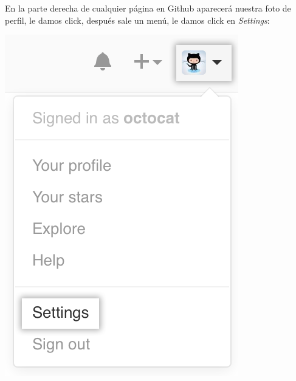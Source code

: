 \documentclass{article}
\begin{document}
\begin{itemize}
\begin{enumerate}
      En la parte derecha de cualquier página en Github aparecerá nuestra foto de perfil, le damos click, después sale un menú, le damos click en \textit{Settings}:
      \begin{center}
        \includegraphics[scale=0.3]{2}
      \end{center}


\end{enumerate}
\end{itemize}
\end{document}
